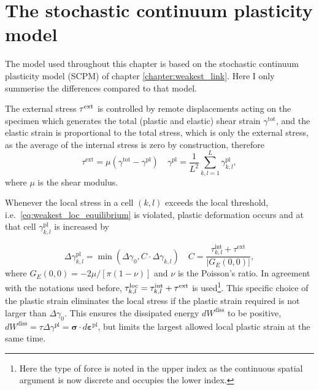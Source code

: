 \section{The stochastic continuum plasticity model}
The model used throughout this chapter is based on the stochastic continuum plasticity model (SCPM) of chapter \ref{chapter:weakest_link}. Here I only summerise the differences compared to that model.

The external stress ${\tau ^{{\rm{ext}}}}$ is controlled by remote displacements acting on the specimen which generates the total (plastic and elastic) shear strain ${\gamma ^{{\text{tot}}}}$, and the elastic strain is proportional to the total stress, which is only the external stress, as the average of the internal stress is zero by construction, therefore
\begin{equation} \label{eq:disorder_gamma_pl}
{\tau ^{{\text{ext}}}} =  \mu \left( {{\gamma ^{{\text{tot}}}} - {\gamma ^{{\text{pl}}}}} \right)\quad {\gamma ^{{\text{pl}}}} = \frac{1}{{{L^2}}}\sum\limits_{k,l = 1}^L {\gamma _{k,l}^{{\text{pl}}}},
\end{equation}
where $\mu$ is the shear modulus.

Whenever the local stress in a cell $\left( {k,l} \right)$ exceeds the local threshold, i.e.\ \cref{eq:weakest_loc_equilibrium} is violated, plastic deformation occurs and at that cell $\gamma _{k,l}^{{\text{pl}}}$ is increased by

\begin{equation} \label{eq:disorder_gamma_rule}
\Delta \gamma _{k,l}^{{\text{pl}}} = \min \left( {\Delta {\gamma _0},C \cdot \Delta {\gamma _{k,l}}} \right)\quad C = \frac{{\tau _{k,l}^{{\text{int}}} + {\tau ^{{\text{ext}}}}}}{{\left| {{G_E}\left( {0,0} \right)} \right|}},
\end{equation}
where ${G_E}\left( {0,0} \right) =  - 2\mu /\left[ {\pi \left( {1 - \nu } \right)} \right]$ and $\nu$ is the Poisson's ratio. In agreement with the notations used before, $\tau _{k,l}^{{\rm{loc}}} = \tau _{k,l}^{{\mathop{\rm int}} } + {\tau ^{{\rm{ext}}}}$ is used\footnote{Here the type of force is noted in the upper index as the continuous spatial argument is now discrete and occupies the lower index.}. This specific choice of the plastic strain eliminates the local stress if the plastic strain required is not larger than ${\Delta {\gamma _0}}$. This ensures the dissipated energy $d{W^{{\text{diss}}}}$ to be positive, $d{W^{{\text{diss}}}} = \tau \Delta {\gamma ^{{\text{pl}}}} = {\mathbf{\sigma }} \cdot d{{\mathbf{\varepsilon }}^{{\text{pl}}}}$, but limits the largest allowed local plastic strain at the same time.

